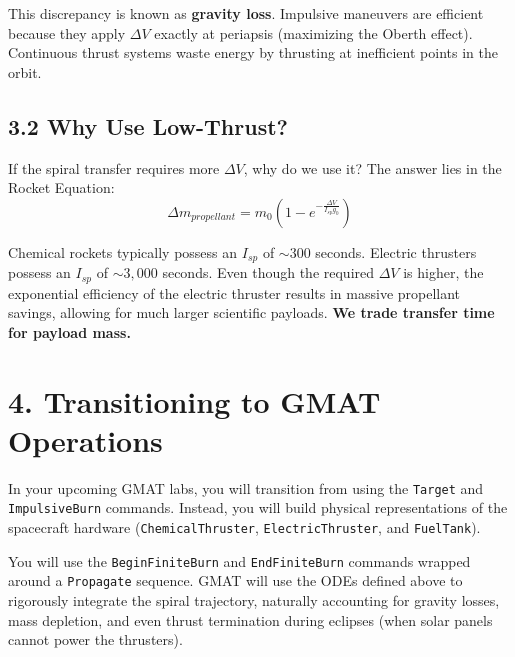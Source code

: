 \documentclass[11pt, a4paper]{article}
\begin{document}
This discrepancy is known as \textbf{gravity loss}. Impulsive maneuvers are efficient because they apply $\Delta V$ exactly at periapsis (maximizing the Oberth effect). Continuous thrust systems waste energy by thrusting at inefficient points in the orbit.

\subsection*{3.2 Why Use Low-Thrust?}
If the spiral transfer requires more $\Delta V$, why do we use it? The answer lies in the Rocket Equation:
\begin{equation}
    \Delta m_{propellant} = m_0 \left( 1 - e^{-\frac{\Delta V}{I_{sp} g_0}} \right)
\end{equation}

Chemical rockets typically possess an $I_{sp}$ of $\sim 300$ seconds. Electric thrusters possess an $I_{sp}$ of $\sim 3,000$ seconds. Even though the required $\Delta V$ is higher, the exponential efficiency of the electric thruster results in massive propellant savings, allowing for much larger scientific payloads. \textbf{We trade transfer time for payload mass.}

\section*{4. Transitioning to GMAT Operations}
In your upcoming GMAT labs, you will transition from using the \texttt{Target} and \texttt{ImpulsiveBurn} commands. Instead, you will build physical representations of the spacecraft hardware (\texttt{ChemicalThruster}, \texttt{ElectricThruster}, and \texttt{FuelTank}). 

You will use the \texttt{BeginFiniteBurn} and \texttt{EndFiniteBurn} commands wrapped around a \texttt{Propagate} sequence. GMAT will use the ODEs defined above to rigorously integrate the spiral trajectory, naturally accounting for gravity losses, mass depletion, and even thrust termination during eclipses (when solar panels cannot power the thrusters).
\end{document}
